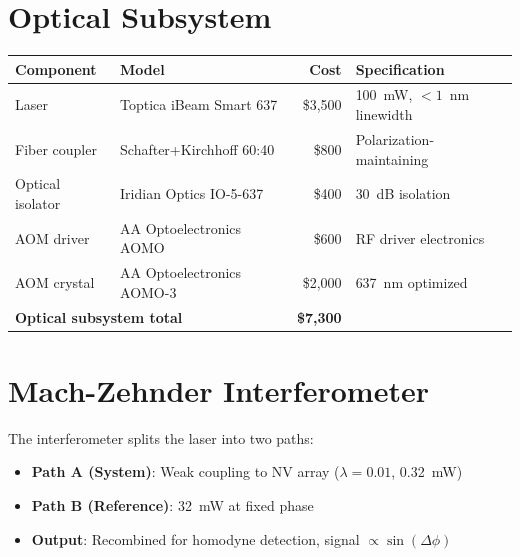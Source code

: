 \documentclass[11pt,a4paper,openany]{book}
\begin{document}
\section{Optical Subsystem}

\begin{center}
\begin{tabular}{llrl}
\toprule
\textbf{Component} & \textbf{Model} & \textbf{Cost} & \textbf{Specification} \\
\midrule
Laser & Toptica iBeam Smart 637 & \$3,500 & 100~mW, $< 1$~nm linewidth \\
Fiber coupler & Schafter+Kirchhoff 60:40 & \$800 & Polarization-maintaining \\
Optical isolator & Iridian Optics IO-5-637 & \$400 & 30~dB isolation \\
AOM driver & AA Optoelectronics AOMO & \$600 & RF driver electronics \\
AOM crystal & AA Optoelectronics AOMO-3 & \$2,000 & 637~nm optimized \\
\midrule
\multicolumn{2}{l}{\textbf{Optical subsystem total}} & \textbf{\$7,300} & \\
\bottomrule
\end{tabular}
\end{center}

\section{Mach-Zehnder Interferometer}

The interferometer splits the laser into two paths:
\begin{itemize}[nosep]
  \item \textbf{Path A (System)}: Weak coupling to NV array ($\lambda = 0.01$, 0.32~mW)
  \item \textbf{Path B (Reference)}: 32~mW at fixed phase
  \item \textbf{Output}: Recombined for homodyne detection, signal $\propto \sin(\Delta\phi)$
\end{itemize}
\end{document}
